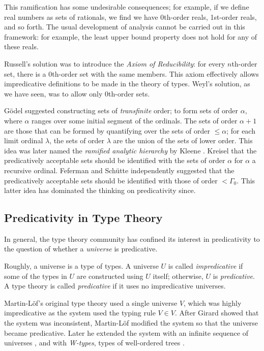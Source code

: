 \documentclass[acmtocl]{acmtrans2m}
\begin{document}
This ramification has some undesirable consequences; for example, if we define real numbers as sets of rationals, we find we have 0th-order reals, 1st-order reals, and so forth.  The usual development of analysis cannot be carried out in this framework: for example, the least upper bound property does not hold for any of these reals.

Russell's solution was to introduce the \emph{Axiom of Reducibility}: for every $n$th-order set, there is a 0th-order set with the same members.  This axiom effectively allows impredicative definitions to be made in the theory of types.  Weyl's solution, as we have seen, was to allow only 0th-order sets.

G\"odel  suggested constructing sets of \emph{transfinite} order; to form sets of order $\alpha$, where $\alpha$ ranges over some initial segment of the ordinals.  The sets of order $\alpha + 1$ are those that can be formed by quantifying over the sets of order $\leq \alpha$; for each limit ordinal $\lambda$, the sets of order $\lambda$ are the union of the sets of lower order.  This idea was later named the \emph{ramified analytic hierarchy} by Kleene .  Kreisel  that the predicatively acceptable sets should be identified with the sets of order $\alpha$ for $\alpha$ a recursive ordinal.  Feferman  and Sch\"utte  independently suggested that the predicatively acceptable sets should be identified with those of order $< \Gamma_0$.  This latter idea has dominated the thinking on predicativity since.


\pagebreak

\subsection{Predicativity in Type Theory}

In general, the type theory community has confined its interest in predicativity to the question of whether a \emph{universe} is predicative.

Roughly, a universe is a type of types.  A universe $U$ is called \emph{impredicative} if some of the types in $U$ are constructed using $U$ itself; otherwise, $U$ is \emph{predicative}.  A type theory is called \emph{predicative} if it uses no impredicative universes.

Martin-L\"of's original type theory \cite{ML:71} used a single
universe $V$, which was highly impredicative as the system used the
typing rule $V \in V$.  After Girard 
showed that the system was inconsistent, Martin-L\"of 
modified the system so that the universe became predicative. Later
he extended the system with an infinite sequence of universes
, and with \emph{W-types}, types of well-ordered
trees  \cite{ml:cmcp}.
\end{document}
